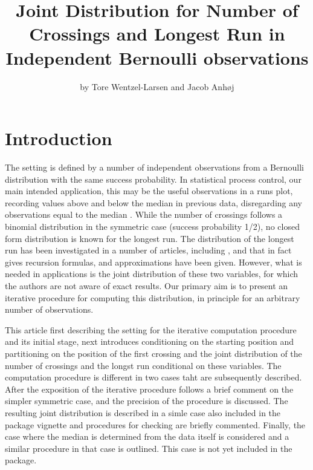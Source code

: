 \title{Joint Distribution for Number of Crossings and Longest Run in Independent Bernoulli observations}
\author{by Tore Wentzel-Larsen and Jacob Anh{\o}j}

\maketitle


\section{Introduction}

The setting is defined by a number of independent observations from a Bernoulli distribution with the same success probability. In statistical process control, our main intended application, this may be the useful observations in a runs plot, recording values above and below the median in previous data, disregarding any observations equal to the median \citep{Anhoej:2015}. While the number of crossings follows a binomial distribution in the symmetric case (success probability 1/2), no closed form distribution is known for the longest run. The distribution of the longest run has been investigated in a number of articles, including \citet{Schilling:2012}, and \citet{Fazekas:2010} that in fact gives recursion formulas, and approximations have been given. However, what is needed in applications is the joint distribution of these two variables, for which the authors are not aware of exact results. Our primary aim is to present an iterative procedure for computing this distribution, in principle for an arbitrary number of observations.

This article first describing the setting for the iterative computation procedure and its initial stage, next introduces conditioning on the starting position and partitioning on the position of the first crossing and the joint distribution of the number of crossings and the longst run conditional on these variables. The computation procedure is different in two cases taht are subsequently described. After the exposition of the iterative procedure follows a brief comment on the simpler symmetric case, and the precision of the procedure is discussed. The resulting joint distribution is described in a simle case also included in the package vignette and procedures for checking are briefly commented. Finally, the case where the median is determined from the data itself is considered and a similar procedure in that case is outlined. This case is not yet included in the package.

